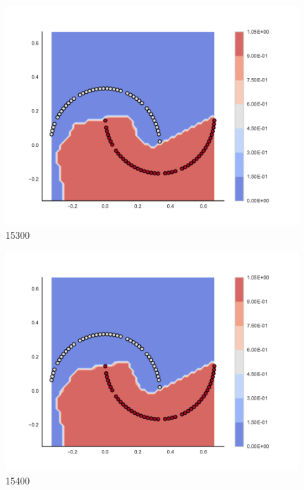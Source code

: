 \begin{subfigure}[b]{0.09\textwidth}
    \includegraphics[clip, trim=2.35cm 1.75cm 4.5cm 0cm,width=\textwidth]{img/convergence/15300.pdf}
    \caption{15300}
    \label{fig:convergence_15300}
\end{subfigure}
%
\begin{subfigure}[b]{0.09\textwidth}
    \includegraphics[clip, trim=2.35cm 1.75cm 4.5cm 0cm,width=\textwidth]{img/convergence/15400.pdf}
    \caption{15400}
    \label{fig:convergence_15400}
\end{subfigure}
%
